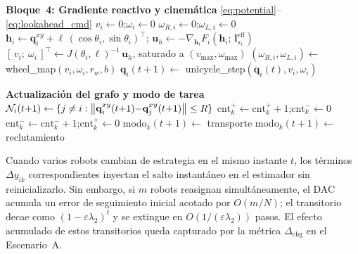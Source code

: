 \begin{algorithm}[htbp]
\begin{algorithmic}[1]
\State \textbf{Bloque~4: Gradiente reactivo y cinemática} \eqref{eq:potential}--\eqref{eq:lookahead_cmd}
 
  \State $v_i \gets 0$;\enspace $\omega_i \gets 0$
  \State $\omega_{R,i}\gets 0$;\enspace $\omega_{L,i}\gets 0$
\Else
  \State $\mathbf{h}_i \gets \mathbf{q}_i^{xy} + \ell\,(\cos\theta_i,\sin\theta_i)^{\top}$;\enspace
         $\mathbf{u}_h \gets -\nabla_{\mathbf{h}_i} F_i(\mathbf{h}_i;\,\mathbf{l}^{\mathrm{eff}}_{s_i})$
  \State $[\,v_i;\ \omega_i\,]^{\top} \gets J(\theta_i,\ell)^{-1}\,\mathbf{u}_h$, saturado a $(v_{\max},\omega_{\max})$
  \State $(\omega_{R,i},\omega_{L,i}) \gets$ wheel\_map$(v_i,\omega_i,r_w,b)$ 
\EndIf
\State $\mathbf{q}_i(t{+}1) \gets $ unicycle\_step$(\mathbf{q}_i(t), v_i, \omega_i)$

\State \textbf{Actualización del grafo y modo de tarea}
\State $\mathcal{N}_i(t{+}1) \gets \{j\neq i : \left\|\mathbf{q}_i^{xy}(t{+}1){-}\mathbf{q}_j^{xy}(t{+}1)\right\|\leq R\}$
    \State $\mathrm{cnt}^{+}_k \gets \mathrm{cnt}^{+}_k + 1$;\enspace $\mathrm{cnt}^{-}_k \gets 0$
  \Else
    \State $\mathrm{cnt}^{-}_k \gets \mathrm{cnt}^{-}_k + 1$;\enspace $\mathrm{cnt}^{+}_k \gets 0$
  \EndIf
    \State modo$_k(t{+}1) \gets $ transporte 
    \State modo$_k(t{+}1) \gets $ reclutamiento 
  \EndIf
\EndFor
\end{algorithmic}
\end{algorithm}

\begin{observacion}
\label{obs:dac_simultaneo}
Cuando varios robots cambian de estrategia en el mismo instante $t$, los términos
$\Delta y_{ik}$ correspondientes inyectan el salto instantáneo en el estimador
sin reinicializarlo. Sin embargo, si $m$ robots reasignan simultáneamente, el DAC
acumula un error de seguimiento inicial acotado por $O(m/N)$; el transitorio decae
como $(1-\varepsilon\lambda_2)^t$ y se extingue en $O(1/(\varepsilon\lambda_2))$ pasos.
El efecto acumulado de estos transitorios queda capturado por la métrica
$\Delta_{\mathrm{chg}}$ en el Escenario~A.
\end{observacion}

